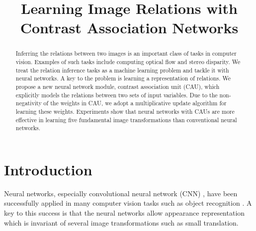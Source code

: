 \documentclass[conference]{IEEEtran}
\begin{document}
\title{Learning Image Relations with \\ Contrast Association Networks}

\author{
\and
{}
\and
{}
\and
{}
}

\maketitle

\begin{abstract}
Inferring the relations between two images is an important class of tasks in computer vision. Examples of such tasks include computing optical flow and stereo disparity. We treat the relation inference tasks as a machine learning problem and tackle it with neural networks. A key to the problem is learning a representation of relations. We propose a new neural network module, contrast association unit (CAU), which explicitly models the relations between two sets of input variables. Due to the non-negativity of the weights in CAU, we adopt a multiplicative update algorithm for learning these weights. Experiments show that neural networks with CAUs are more effective in learning five fundamental image transformations than conventional neural networks.
\end{abstract}





\section{Introduction}

Neural networks, especially convolutional neural network (CNN) \cite{lecun1998gradient}, have been successfully applied in many computer vision tasks such as
object recognition \cite{ciresan2012multi,krizhevsky2012imagenet}. A key to this success is that the neural networks allow appearance representation which is invariant of several image transformations such as small translation.
\end{document}
